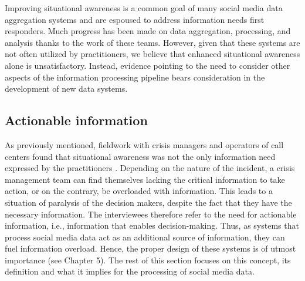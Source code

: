 Improving situational awareness is a common goal of many social media data aggregation systems and are espoused to address information needs first responders.
Much progress has been made on data aggregation, processing, and analysis thanks to the work of these teams.
However, given that these systems are not often utilized by practitioners, we believe that enhanced situational awareness alone is unsatisfactory.
Instead, evidence pointing to the need to consider other aspects of the information processing pipeline bears consideration in the development of new data systems.

\subsection{Actionable information}
As previously mentioned, fieldwork with crisis managers and operators of call centers found
that situational awareness was not the only information need expressed by the practitioners
\parencite{zadeSituationalAwarenessActionability2018, kropczynskiIdentifyingActionableInformation2018}.
Depending on the nature of the incident, a crisis management team can find themselves lacking
the critical information to take action, or on the contrary, be overloaded with information.
This leads to a situation of paralysis of the decision makers, despite the fact that they have the necessary information.
The interviewees therefore refer to the need for actionable information, i.e., information that enables decision-making.
Thus, as systems that process social media data act as an additional source of information, they can fuel information overload.
Hence, the proper design of these systems is of utmost importance (see Chapter 5).
The rest of this section focuses on this concept, its definition and what it implies for the processing of social media data.

